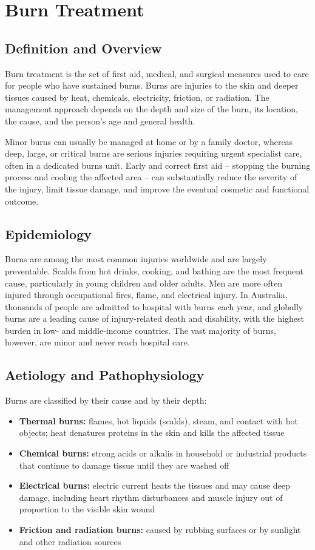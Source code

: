 \chapter{Burn Treatment}

\section*{Definition and Overview}
Burn treatment is the set of first aid, medical, and surgical measures used to care for people who have sustained burns. Burns are injuries to the skin and deeper tissues caused by heat, chemicals, electricity, friction, or radiation. The management approach depends on the depth and size of the burn, its location, the cause, and the person's age and general health.

Minor burns can usually be managed at home or by a family doctor, whereas deep, large, or critical burns are serious injuries requiring urgent specialist care, often in a dedicated burns unit. Early and correct first aid -- stopping the burning process and cooling the affected area -- can substantially reduce the severity of the injury, limit tissue damage, and improve the eventual cosmetic and functional outcome.

\section*{Epidemiology}
Burns are among the most common injuries worldwide and are largely preventable. Scalds from hot drinks, cooking, and bathing are the most frequent cause, particularly in young children and older adults. Men are more often injured through occupational fires, flame, and electrical injury. In Australia, thousands of people are admitted to hospital with burns each year, and globally burns are a leading cause of injury-related death and disability, with the highest burden in low- and middle-income countries. The vast majority of burns, however, are minor and never reach hospital care.

\section*{Aetiology and Pathophysiology}
Burns are classified by their cause and by their depth:
\begin{itemize}
    \item \textbf{Thermal burns:} flames, hot liquids (scalds), steam, and contact with hot objects; heat denatures proteins in the skin and kills the affected tissue
    \item \textbf{Chemical burns:} strong acids or alkalis in household or industrial products that continue to damage tissue until they are washed off
    \item \textbf{Electrical burns:} electric current heats the tissues and may cause deep damage, including heart rhythm disturbances and muscle injury out of proportion to the visible skin wound
    \item \textbf{Friction and radiation burns:} caused by rubbing surfaces or by sunlight and other radiation sources
\end{itemize}

